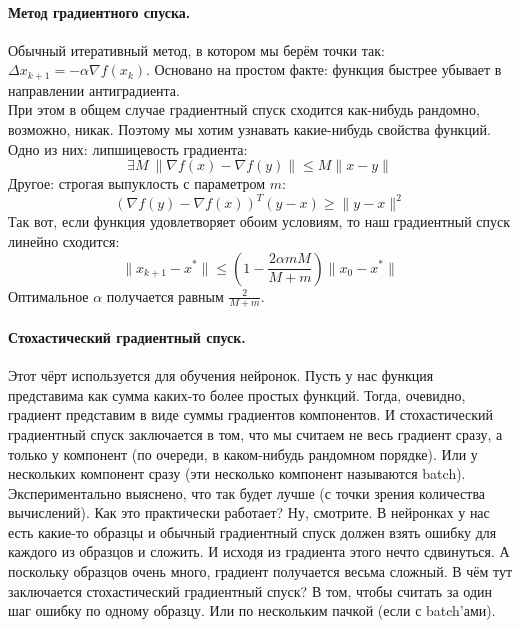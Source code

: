 \documentclass{article}
\begin{document}
    \paragraph{Метод градиентного спуска.}
    Обычный итеративный метод, в котором мы берём точки так: $\Delta x_{k+1}=-\alpha\nabla f(x_k)$. Основано на простом факте: функция быстрее убывает в направлении антиградиента.\\
    При этом в общем случае градиентный спуск сходится как-нибудь рандомно, возможно, никак. Поэтому мы хотим узнавать какие-нибудь свойства функций. Одно из них: липшицевость градиента:
    \[
    \exists M~\|\nabla f(x)-\nabla f(y)\|\leqslant M\|x-y\|
    \]
    Другое: строгая выпуклость с параметром $m$:
    \[
    (\nabla f(y)-\nabla f(x))^T(y-x)\geqslant\|y-x\|^2
    \]
    Так вот, если функция удовлетворяет обоим условиям, то наш градиентный спуск линейно сходится:
    \[
    \|x_{k+1}-x^*\|\leqslant\left(1-\frac{2\alpha mM}{M+m}\right)\|x_0-x^*\|
    \]
    Оптимальное $\alpha$ получается равным $\frac2{M+m}$.
    \paragraph{Стохастический градиентный спуск.}
    Этот чёрт используется для обучения нейронок. Пусть у нас функция представима как сумма каких-то более простых функций. Тогда, очевидно, градиент представим в виде суммы градиентов компонентов. И стохастический градиентный спуск заключается в том, что мы считаем не весь градиент сразу, а только у компонент (по очереди, в каком-нибудь рандомном порядке). Или у нескольких компонент сразу (эти несколько компонент называются batch). Экспериментально выяснено, что так будет лучше (с точки зрения количества вычислений). Как это практически работает? Ну, смотрите. В нейронках у нас есть какие-то образцы и обычный градиентный спуск должен взять ошибку для каждого из образцов и сложить. И исходя из градиента этого нечто сдвинуться. А поскольку образцов очень много, градиент получается весьма сложный. В чём тут заключается стохастический градиентный спуск? В том, чтобы считать за один шаг ошибку по одному образцу. Или по нескольким пачкой (если с batch'ами).
\end{document}

